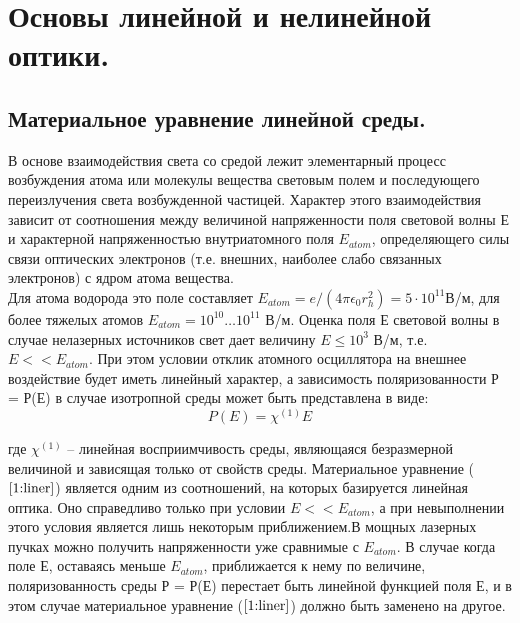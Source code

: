 \section{Основы линейной и нелинейной оптики.}

\subsection{Материальное уравнение линейной среды.}
В основе взаимодействия света со средой лежит элементарный
процесс возбуждения атома или молекулы вещества световым полем и последующего переизлучения света возбужденной частицей. Характер этого взаимодействия зависит от соотношения между величиной напряженности поля световой волны Е и характерной напряженностью внутриатомного поля $E_{atom}$, определяющего силы связи оптических электронов (т.е. внешних, наиболее слабо связанных электронов) с ядром атома вещества.
\\
\hspace*{2mm}
Для атома водорода это поле составляет $ E_{atom} = e/(4\pi\epsilon_{0}r_{h}^2) = 5\cdot10^{11} $В/м, для более тяжелых атомов $ E_{atom} = 10^{10} \dots 10^{11} $ В/м. Оценка поля Е световой волны в случае нелазерных источников свет дает величину $E \le 10^3$ В/м, т.е. $E<<E_{atom} $. При этом условии отклик атомного осциллятора на внешнее воздействие будет иметь линейный характер, а зависимость поляризованности Р = Р(Е) в случае изотропной среды может быть представлена в виде:
\begin{equation}\label{1:liner}
P(E) = \chi^{(1)}E
\end{equation}

где $ \chi^{(1)}$ – линейная восприимчивость среды, являющаяся безразмерной величиной и зависящая только от свойств среды.
Материальное уравнение ($\ref{1:liner}$) является одним из соотношений, на которых базируется линейная оптика.  Оно справедливо только при условии $E << E_{atom} $, а при невыполнении этого условия является лишь некоторым приближением.В мощных лазерных пучках можно получить напряженности уже сравнимые с $E_{atom} $. В случае когда поле Е, оставаясь меньше $E_{atom} $, приближается к нему по величине, поляризованность среды Р = Р(Е) перестает быть линейной функцией поля Е, и в этом случае материальное уравнение ($\ref{1:liner}$) должно быть заменено на другое.


